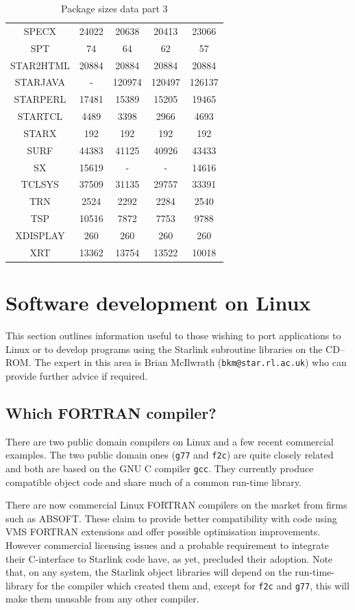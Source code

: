 \documentclass[twoside,11pt]{article}
\newcommand{\xlabel}[1]{}
\renewcommand{\_}{\texttt{\symbol{95}}}
\newcommand{\cdrom}{CD--ROM}
\newcommand{\cdrom}{CD-ROM}
\begin{document}
\begin{table}[p]
\begin{center}
\begin{tabular}{|c|c|c|c|c|}
SPECX & 24022 & 20638 & 20413 & 23066 \\ 
SPT & 74 & 64 & 62 & 57 \\ 
STAR2HTML & 20884 & 20884 & 20884 & 20884 \\ 
STARJAVA & - & 120974 & 120497 & 126137 \\ 
STARPERL & 17481 & 15389 & 15205 & 19465 \\ 
STARTCL & 4489 & 3398 & 2966 & 4693 \\ 
STARX & 192 & 192 & 192 & 192 \\ 
SURF & 44383 & 41125 & 40926 & 43433 \\ 
SX & 15619 & - & - & 14616 \\ 
TCLSYS & 37509 & 31135 & 29757 & 33391 \\ 
TRN & 2524 & 2292 & 2284 & 2540 \\ 
TSP & 10516 & 7872 & 7753 & 9788 \\ 
XDISPLAY & 260 & 260 & 260 & 260 \\ 
XRT & 13362 & 13754 & 13522 & 10018 \\ 
\hline
\end{tabular}
\caption{Package sizes data part 3}
\end{center}
\end{table}

\newpage
\section{\xlabel{software_development_on_linux}Software development on Linux}
\label{software_development_on_linux}

This section outlines information useful to those wishing to port
applications to Linux or to develop programs using the Starlink subroutine
libraries on the \cdrom\@.  The expert in this area is Brian McIlwrath
(\texttt{bkm@star.rl.ac.uk}) who can provide further advice if required. 
 
\subsection{Which FORTRAN compiler?}

There are two public domain compilers on Linux and a few recent commercial
examples.  The two public domain ones (\texttt{g77} and \texttt{f2c}) are
quite closely related and both are based on the GNU C compiler \texttt{gcc}.
They currently produce compatible object code and share much of a common 
run-time library.

There are now commercial Linux FORTRAN compilers on the market from firms
such as ABSOFT\@.  These claim to provide better compatibility with code
using VMS FORTRAN extensions and offer possible optimisation improvements.
However commercial licensing issues and a probable requirement to
integrate their C-interface to Starlink code have, as yet, precluded
their adoption.  Note that, on any system, the Starlink object
libraries will depend on the run-time-library for the compiler which
created them and, except for \texttt{f2c} and \texttt{g77}, this will
make them unusable from any other compiler.
\end{document}
